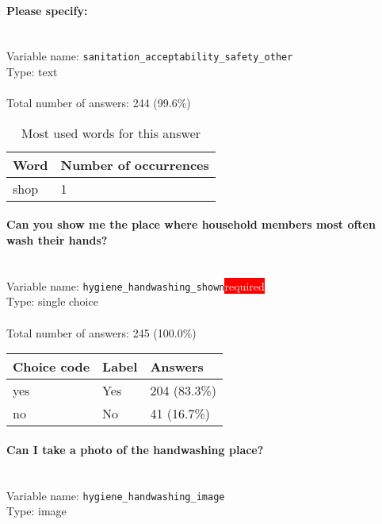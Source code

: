 \documentclass[11.5pt, a4paper]{scrartcl}
\begin{document}
\paragraph{Please specify:}
\  \\Variable name: \texttt{sanitation\_acceptability\_safety\_other}\\
Type: text\\
\\Total number of answers: 244 (99.6\%)
\\[0.2em]\begin{table}[H]
 \begin{tabular}{p{4cm}|p{8cm}}
Word & Number of occurrences  \\
\hline
\cellcolor{mygray}shop&\cellcolor{mygray}1\\
\hline
\end{tabular}
\caption{\label{tab:table-name} Most used words for this answer}
\end{table}
\paragraph{Can you show me the place where household members most often wash their hands? }
\  \\Variable name: \texttt{hygiene\_handwashing\_shown}\hfill\colorbox{red}{\small{\textcolor{white}{required}}}\\
 Type: single choice\\
\\Total number of answers: 245 (100.0\%)
\\[0.2em] \begin{tabular}{p{4cm}|p{8cm}|p{3cm}}
Choice code & Label & Answers \\
\hline
yes & Yes& \cellcolor{color4}204 (83.3\%)\\
\cellcolor{mygray} no & \cellcolor{mygray}No & \cellcolor{color0}41 (16.7\%)\\
\end{tabular}
\paragraph{Can I take a photo of the handwashing place?}
\  \\Variable name: \texttt{hygiene\_handwashing\_image}\\
Type: image\\
\end{document}
